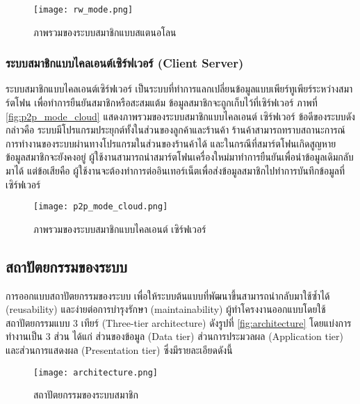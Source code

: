 \documentclass[a4paper]{article}
\begin{document}
\begin{figure}[ht!]
\centering
\texttt{[image: rw\_mode.png]}
\caption{ภาพรวมของระบบสมาชิกแบบสแตนอโลน} \label{fig:rw_mode}
\label{overflow}
\end{figure}

\subsubsection{ระบบสมาชิกแบบไคลเอนต์เซิร์ฟเวอร์ (Client Server)}
ระบบสมาชิกแบบไคลเอนต์เซิร์ฟเวอร์ เป็นระบบที่ทำการแลกเปลี่ยนข้อมูลแบบเพียร์ทูเพียร์ระหว่างสมาร์ตโฟน เพื่อทำการยืนยันสมาชิกหรือสะสมแต้ม ข้อมูลสมาชิกจะถูกเก็บไว้ที่เซิร์ฟเวอร์ ภาพที่ \ref{fig:p2p_mode_cloud} แสดงภาพรวมของระบบสมาชิกแบบไคลเอนต์ เซิร์ฟเวอร์ ข้อดีของระบบดังกล่าวคือ ระบบมีโปรแกรมประยุกต์ทั้งในส่วนของลูกค้าและร้านค้า ร้านค้าสามารถทราบสถานะการณ์การทำงานของระบบผ่านทางโปรแกรมในส่วนของร้านค้าได้ และในกรณีที่สมาร์ตโฟนเกิดสูญหาย ข้อมูลสมาชิกจะยังคงอยู่ ผู้ใช้งานสามารถนำสมาร์ตโฟนเครื่องใหม่มาทำการยืนยันเพื่อนำข้อมูลเดิมกลับมาได้ แต่ข้อเสียคือ ผู้ใช้งานจะต้องทำการต่ออินเทอร์เน็ตเพื่อส่งข้อมูลสมาชิกไปทำการบันทึกข้อมูลที่เซิร์ฟเวอร์

\begin{figure}[ht!]
\centering
\texttt{[image: p2p\_mode\_cloud.png]}
\caption{ภาพรวมของระบบสมาชิกแบบไคลเอนต์ เซิร์ฟเวอร์} \label{fig:p2p_mode_cloud}
\label{overflow}
\end{figure}

\subsection{สถาปัตยกรรมของระบบ}
การออกแบบสถาปัตยกรรมของระบบ เพื่อให้ระบบต้นแบบที่พัฒนาขึ้นสามารถนำกลับมาใช้ซ้ำได้ (reusability) และง่ายต่อการบำรุงรักษา (maintainability) ผู้ทำโครงงานออกแบบโดยใช้สถาปัตยกรรมแบบ 3 เทียร์ (Three-tier architecture) ดังรูปที่ \ref{fig:architecture} โดยแบ่งการทำงานเป็น 3 ส่วน ได้แก่ ส่วนของข้อมูล (Data tier) ส่วนการประมวลผล (Application tier) และส่วนการแสดงผล (Presentation tier) ซึ่งมีรายละเอียดดังนี้

\begin{figure}[ht!]
\centering
\texttt{[image: architecture.png]}
\caption{สถาปัตยกรรมของระบบสมาชิก} \label{fig:architecture}
\label{overflow}
\end{figure}
\end{document}
